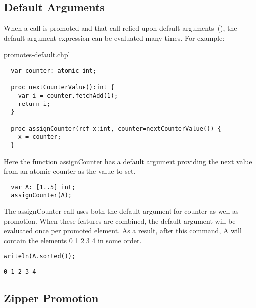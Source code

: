 \subsection{Default Arguments}
\label{Promotion_Default_Arguments}

When a call is promoted and that call relied upon default
arguments~(), the default argument expression can
be evaluated many times. For example:

\begin{chapelexample}{promotes-default.chpl}
\begin{chapel}
\begin{verbatim}
  var counter: atomic int;

  proc nextCounterValue():int {
    var i = counter.fetchAdd(1);
    return i;
  }

  proc assignCounter(ref x:int, counter=nextCounterValue()) {
    x = counter;
  }
\end{verbatim}
\end{chapel}

Here the function assignCounter has a default argument
providing the next value from an atomic counter as the value to set.

\begin{chapel}
\begin{verbatim}
  var A: [1..5] int;
  assignCounter(A);
\end{verbatim}
\end{chapel}

The assignCounter call uses both the default argument for counter as well
as promotion. When these features are combined, the default argument
will be evaluated once per promoted element. As a result, after this
command, A will contain the elements 0 1 2 3 4 in some order.

\begin{chapelnoprint}
\begin{verbatim}
writeln(A.sorted());
\end{verbatim}
\end{chapelnoprint}
\begin{chapeloutput}
\begin{verbatim}
0 1 2 3 4
\end{verbatim}
\end{chapeloutput}
\end{chapelexample}


\subsection{Zipper Promotion}
\label{Zipper_Promotion}

